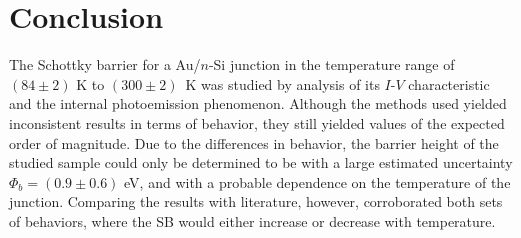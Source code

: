 \section{Conclusion}

The Schottky barrier for a Au/$n$-Si junction in the temperature range of $(84 \pm 2)$ K to \mbox{$(300 \pm 2)$ K} was studied by analysis of its $I$-$V$ characteristic and the internal photoemission phenomenon.
Although the methods used yielded inconsistent results in terms of behavior, they still yielded values of the expected order of magnitude.
Due to the differences in behavior, the barrier height of the studied sample could only be determined to be with a large estimated uncertainty $\Phi_b = (0.9 \pm 0.6)$ eV, and with a probable dependence on the temperature of the junction.
Comparing the results with literature, however,  corroborated both sets of behaviors, where the SB would either increase or decrease with temperature.
